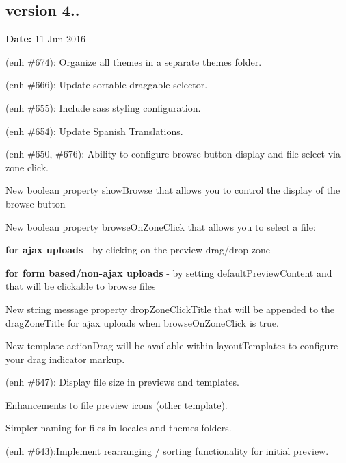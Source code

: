 \subsection*{version 4..}

{\bfseries Date\+:} 11-\/\+Jun-\/2016


\begin{DoxyItemize}
\item (enh \#674)\+: Organize all themes in a separate {\ttfamily themes} folder.
\item (enh \#666)\+: Update sortable draggable selector.
\item (enh \#655)\+: Include sass styling configuration.
\item (enh \#654)\+: Update Spanish Translations.
\item (enh \#650, \#676)\+: Ability to configure browse button display and file select via zone click.
\begin{DoxyItemize}
\item New boolean property {\ttfamily show\+Browse} that allows you to control the display of the browse button
\item New boolean property {\ttfamily browse\+On\+Zone\+Click} that allows you to select a file\+:
\begin{DoxyItemize}
\item {\bfseries for ajax uploads} -\/ by clicking on the preview drag/drop zone
\item {\bfseries for form based/non-\/ajax uploads} -\/ by setting {\ttfamily default\+Preview\+Content} and that will be clickable to browse files
\end{DoxyItemize}
\item New string message property {\ttfamily drop\+Zone\+Click\+Title} that will be appended to the {\ttfamily drag\+Zone\+Title} for ajax uploads when {\ttfamily browse\+On\+Zone\+Click} is {\ttfamily true}.
\item New template {\ttfamily action\+Drag} will be available within {\ttfamily layout\+Templates} to configure your drag indicator markup.
\end{DoxyItemize}
\item (enh \#647)\+: Display file size in previews and templates.
\item Enhancements to file preview icons ({\ttfamily other} template).
\item Simpler naming for files in locales and themes folders.
\item (enh \#643)\+:Implement rearranging / sorting functionality for initial preview.

\end{DoxyItemize}
